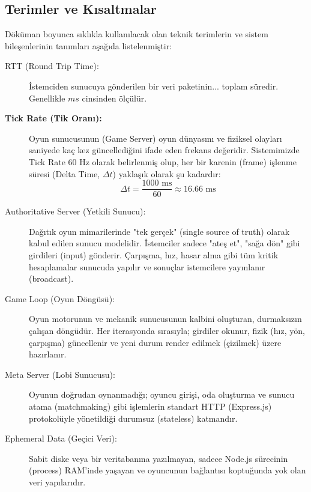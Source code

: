 \documentclass[12pt,a4paper]{article}
\begin{document}
\subsection{Terimler ve Kısaltmalar}
Döküman boyunca sıklıkla kullanılacak olan teknik terimlerin ve sistem bileşenlerinin tanımları
aşağıda listelenmiştir:
\begin{description}
      \item[RTT (Round Trip Time):] İstemciden sunucuya gönderilen bir veri paketinin...
            toplam süredir. Genellikle $ms$ cinsinden ölçülür.

      \item[\textbf{Tick Rate (Tik Oranı):}] Oyun sunucusunun (Game Server) oyun dünyasını
            ve fiziksel olayları saniyede kaç kez güncellediğini ifade eden frekans değeridir.
            Sistemimizde Tick Rate $60 \text{ Hz}$ olarak belirlenmiş olup, her bir karenin
            (frame) işlenme süresi (Delta Time, $\Delta t$) yaklaşık olarak şu kadardır:
            \[
                  \Delta t = \frac{1000 \text{ ms}}{60} \approx 16.66 \text{ ms}
            \]
      \item[Authoritative Server (Yetkili Sunucu):] Dağıtık oyun mimarilerinde "tek gerçek"
            (single source of truth) olarak kabul edilen sunucu modelidir. İstemciler sadece
            "ateş et", "sağa dön" gibi girdileri (input) gönderir. Çarpışma, hız, hasar alma
            gibi tüm kritik hesaplamalar sunucuda yapılır ve sonuçlar istemcilere yayınlanır (broadcast).

      \item[Game Loop (Oyun Döngüsü):] Oyun motorunun ve mekanik sunucusunun kalbini oluşturan,
            durmaksızın çalışan döngüdür. Her iterasyonda sırasıyla; girdiler okunur, fizik
            (hız, yön, çarpışma) güncellenir ve yeni durum render edilmek (çizilmek) üzere hazırlanır.

      \item[Meta Server (Lobi Sunucusu):] Oyunun doğrudan oynanmadığı; oyuncu girişi, oda oluşturma
            ve sunucu atama (matchmaking) gibi işlemlerin standart HTTP (Express.js) protokolüyle
            yönetildiği durumsuz (stateless) katmandır.

      \item[Ephemeral Data (Geçici Veri):] Sabit diske veya bir veritabanına yazılmayan, sadece
            Node.js sürecinin (process) RAM'inde yaşayan ve oyuncunun bağlantısı koptuğunda
            yok olan veri yapılarıdır.
\end{description}
\end{document}
